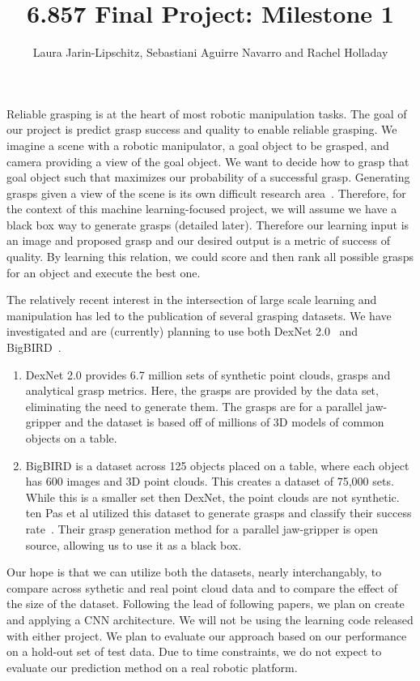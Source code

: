 \documentclass[letterpaper, 10 pt]{article}
\begin{document}
\title{6.857 Final Project: Milestone 1}
\author{Laura Jarin-Lipschitz, Sebastiani Aguirre Navarro and Rachel Holladay}
\maketitle

Reliable grasping is at the heart of most robotic manipulation tasks. 
The goal of our project is predict grasp success and quality to enable reliable grasping. 
We imagine a scene with a robotic manipulator, a goal object to be grasped, and camera providing a view of the goal object.
We want to decide how to grasp that goal object such that maximizes our probability of a successful grasp.
Generating grasps given a view of the scene is its own difficult research area~\cite{pinto2016supersizing,lenz2015deep,jiang2011efficient}.
Therefore, for the context of this machine learning-focused project, we will assume we have a black box way to generate grasps (detailed later). 
Therefore our learning input is an image and proposed grasp and our desired output is a metric of success of quality. 
By learning this relation, we could score and then rank all possible grasps for an object and execute the best one. 

The relatively recent interest in the intersection of large scale learning and manipulation has led to the publication of several grasping datasets. 
We have investigated and are (currently) planning to use both DexNet 2.0~\cite{mahler2017dex} and BigBIRD~\cite{singh2014bigbird}. 
\begin{enumerate}
   \item DexNet 2.0 provides 6.7 million sets of synthetic point clouds, grasps and analytical grasp metrics. Here, the grasps are provided by the data set, eliminating the need to generate them. The grasps are for a parallel jaw-gripper and the dataset is based off of millions of 3D models of common objects on a table.  
   \item BigBIRD is a dataset across 125 objects placed on a table, where each object has 600 images and 3D point clouds. This creates a dataset of 75,000 sets. While this is a smaller set then DexNet, the point clouds are not synthetic. ten Pas et al utilized this dataset to generate grasps and classify their success rate~\cite{pas2017grasp}. Their grasp generation method for a parallel jaw-gripper is open source, allowing us to use it as a black box. 
\end{enumerate}

Our hope is that we can utilize both the datasets, nearly interchangably, to compare across sythetic and real point cloud data and to compare the effect of the size of the dataset. 
Following the lead of following papers, we plan on create and applying a CNN architecture. 
We will not be using the learning code released with either project. 
We plan to evaluate our approach based on our performance on a hold-out set of test data. 
Due to time constraints, we do not expect to evaluate our prediction method on a real robotic platform. 




{\footnotesize
    
}
\end{document}
